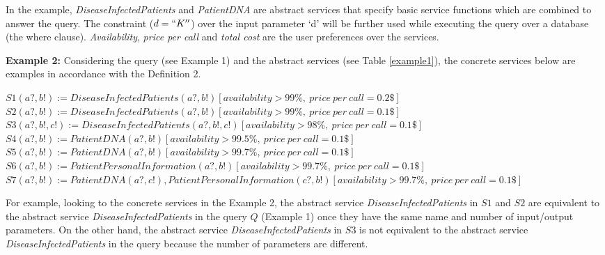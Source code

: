 In the example, \textit{DiseaseInfectedPatients} and \textit{PatientDNA} are abstract services that specify basic service functions which are combined to answer the query. 
The constraint ($d = ``K''$) over the input parameter `d' will be further used while executing the query over a database (the where clause). 
\textit{Availability}, \textit{price per call} and \textit{total cost} are the user preferences over the services.

\noindent \textbf{Example 2:} Considering the query (see Example 1) and the abstract services (see Table \ref{example1}), the concrete services below are examples in accordance with the Definition 2.

\begin{flushleft}
$S1 (a?, b!) := DiseaseInfectedPatients(a?, b!)[availability > 99\%, \ price \ per \ call = 0.2\$]$ \\
$S2 (a?, b!) := DiseaseInfectedPatients(a?, b!)[availability > 99\%, \ price \ per \ call = 0.1\$]$ \\
$S3 (a?, b!, c!) := DiseaseInfectedPatients(a?, b!, c!)[availability > 98\%, \ price \ per \ call = 0.1\$]$ \\
$S4 (a?, b!) := PatientDNA(a?, b!)[availability > 99.5\%, \ price \ per \ call = 0.1\$]$ \\
$S5 (a?, b!) := PatientDNA(a?, b!)[availability > 99.7\%, \ price \ per \ call = 0.1\$]$ \\
$S6 (a?, b!) := PatientPersonalInformation(a?, b!)[availability > 99.7\%, \ price \ per \ call = 0.1\$]$ \\
$S7 (a?, b!) := PatientDNA(a?, c!),PatientPersonalInformation(c?, b!)[availability > 99.7\%, \ price \ per \ call = 0.1\$]$ \\

\end{flushleft}

For example, looking to the concrete services in the Example 2, the abstract service \textit{DiseaseInfectedPatients} in $S1$ and $S2$ are equivalent to the abstract service \textit{DiseaseInfectedPatients} in the query $Q$ (Example 1) once they have the same name and number of input/output parameters.
On the other hand, the abstract service \textit{DiseaseInfectedPatients} in $S3$ is not equivalent to the abstract service \textit{DiseaseInfectedPatients} in the query because the number of parameters are different.


